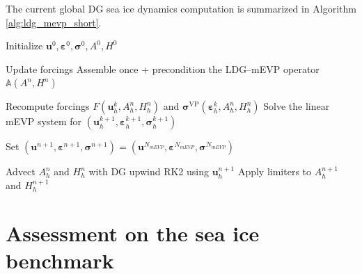 \documentclass[11pt]{article}
\newcommand{\bu}{\mathbf{u}}
\newcommand{\sig}{\boldsymbol{\sigma}}
\newcommand{\beps}{\boldsymbol{\varepsilon}}
\begin{document}
The current global DG sea ice dynamics computation is summarized in Algorithm \ref{alg:ldg_mevp_short}.
\begin{algorithm}[h]
\caption{DG sea-ice dynamics}
\label{alg:ldg_mevp_short}
\begin{algorithmic}[1]
\State Initialize $\bu^0,\beps^0,\sig^0,A^0,H^0$

    \State Update forcings
    \State Assemble once + precondition the LDG--mEVP operator $\mathbb{A}(A^n,H^n)$

        \State Recompute forcings $F(\bu_h^{k},A_h^n,H_h^n)$ and
        $\sig^{\mathrm{VP}}(\beps_h^{k},A_h^n,H_h^n)$
        \State Solve the linear mEVP system for
        $(\bu_h^{k+1},\beps_h^{k+1},\sig_h^{k+1})$
    \EndFor

    \State Set
    $(\bu^{n+1},\beps^{n+1},\sig^{n+1})
    =(\bu^{N_{mEVP}},\beps^{N_{mEVP}},\sig^{N_{mEVP}})$

    \State Advect $A_h^n$ and $H_h^n$ with DG upwind RK2 using $\bu_h^{n+1}$
    \State Apply limiters to $A_h^{n+1}$ and $H_h^{n+1}$
\EndFor
\end{algorithmic}
\end{algorithm}



 

\section{Assessment on the sea ice benchmark}
\end{document}
